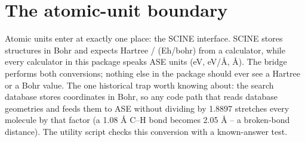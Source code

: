 \section*{The atomic-unit boundary}

Atomic units enter at exactly one place: the SCINE interface.  SCINE
stores structures in Bohr and expects Hartree / (Eh/bohr) from a
calculator, while every calculator in this package speaks ASE units (eV,
eV/\AA{}, \AA{}).  The bridge performs both conversions; nothing else in
the package should ever see a Hartree or a Bohr value.  The one historical
trap worth knowing about: the search database stores coordinates in Bohr,
so any code path that reads database geometries and feeds them to ASE
without dividing by 1.8897 stretches every molecule by that factor (a 1.08
\AA{} C--H bond becomes 2.05 \AA{} -- a broken-bond distance).  The utility
script  checks this conversion with a
known-answer test.
